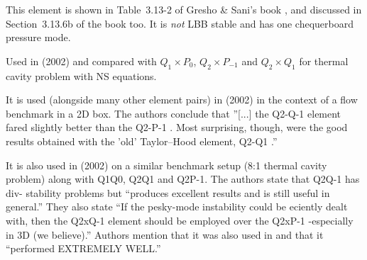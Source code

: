 
This element is shown in Table~3.13-2 of Gresho \& Sani's book \cite{grsa}, 
and discussed in Section~3.13.6b of the book too. It is {\it not} LBB stable
and has one chequerboard pressure mode.

Used in \textcite{grsu02} (2002) and compared with $Q_1\times P_0$, $Q_2\times P_{-1}$ and 
$Q_2\times Q_1$ for thermal cavity problem with NS equations.

It is used (alongside many other element pairs) in \textcite{chgs02} (2002) in the context of 
a flow benchmark in a 2D box. The authors conclude that ''[...] the Q2-Q-1 element fared
slightly better than the Q2-P-1 . Most surprising, though, were the good results obtained with
the 'old' Taylor–Hood element, Q2-Q1 .''

It is also used in \textcite{grsu02} (2002) on a similar benchmark setup (8:1 thermal 
cavity problem) along with Q1Q0, Q2Q1 and Q2P-1. The authors state that Q2Q-1 has div- stability problems
but ``produces excellent results and is still useful in general.''
They also state ``If the pesky-mode instability could be eciently dealt with, then the Q2xQ-1 element
should be employed over the Q2xP-1 -especially in 3D (we believe).''
Authors mention that it was also used in \textcite{dejo83} and that it ``performed
EXTREMELY WELL.''

 
